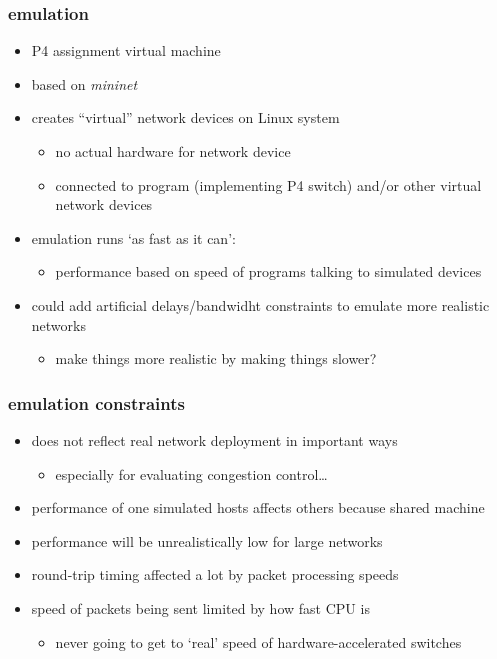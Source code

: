 \begin{frame}
\frametitle{emulation}
\begin{itemize}
\item P4 assignment virtual machine
\item based on \textit{mininet}
\item creates ``virtual'' network devices on Linux system
    \begin{itemize}
    \item no actual hardware for network device
    \item connected to program (implementing P4 switch) and/or other virtual network devices
    \end{itemize}
\item emulation runs `as fast as it can':
    \begin{itemize}
    \item performance based on speed of programs talking to simulated devices
    \end{itemize}
\item could add artificial delays/bandwidht constraints to emulate more realistic networks
    \begin{itemize}
    \item make things more realistic by making things slower?
    \end{itemize}
\end{itemize}
\end{frame}

\begin{frame}
\frametitle{emulation constraints}
\begin{itemize}
\item does not reflect real network deployment in important ways
    \begin{itemize}
        \item especially for evaluating congestion control\ldots
    \end{itemize}
\vspace{.5cm}
\item performance of one simulated hosts affects others because shared machine
\item performance will be unrealistically low for large networks
\item round-trip timing affected a lot by packet processing speeds
\item speed of packets being sent limited by how fast CPU is
    \begin{itemize}
    \item never going to get to `real' speed of hardware-accelerated switches
    \end{itemize}
\end{itemize}
\end{frame}
